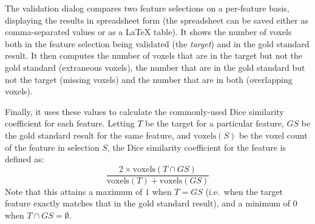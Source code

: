 The validation dialog compares two feature selections on a per-feature basis, displaying the results in spreadsheet form (the spreadsheet can be saved either as comma-separated values or as a \LaTeX{} table). It shows the number of voxels both in the feature selection being validated (the \emph{target}) and in the gold standard result. It then computes the number of voxels that are in the target but not the gold standard (extraneous voxels), the number that are in the gold standard but not the target (missing voxels) and the number that are in both (overlapping voxels).

\newpage

\noindent Finally, it uses these values to calculate the commonly-used Dice similarity coefficient \cite{dice45} for each feature. Letting $T$ be the target for a particular feature, $\mathit{GS}$ be the gold standard result for the same feature, and $\mbox{voxels}(S)$ be the voxel count of the feature in selection $S$, the Dice similarity coefficient for the feature is defined as:
%
\[
\frac{2 \times \mbox{voxels}(T \cap \mathit{GS})}{\mbox{voxels}(T) + \mbox{voxels}(\mathit{GS})}
\]
%
Note that this attains a maximum of $1$ when $T = \mathit{GS}$ (i.e.~when the target feature exactly matches that in the gold standard result), and a minimum of $0$ when $T \cap \mathit{GS} = \emptyset$.

